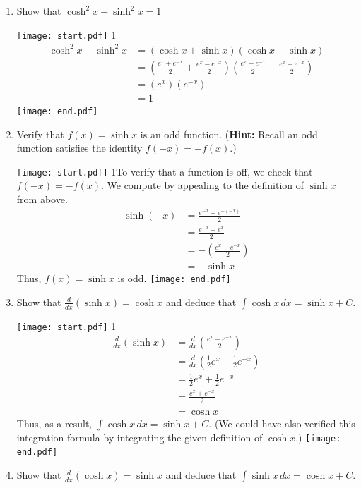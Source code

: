 \documentclass[12pt]{article}
\begin{document}
\begin{enumerate}
\begin{enumerate}

\item Show that $\cosh^2{x}-\sinh^2{x}=1$

\texttt{[image: start.pdf]}
{{{1\linewidth}{
\begin{align*}
\cosh^2{x}-\sinh^{2}{x} & = (\cosh{x}+\sinh{x})(\cosh{x}-\sinh{x})\\
&=\left(\frac{e^x+e^{-x}}{2}+\frac{e^x-e^{-x}}{2}\right)\left(\frac{e^x+e^{-x}}{2}-\frac{e^x-e^{-x}}{2}\right)\\
&=(e^x)(e^{-x})\\
&=1
\end{align*}
}}}
\texttt{[image: end.pdf]}


\item Verify that $f(x)=\sinh{x}$ is an odd function. ({\bf Hint:} Recall an odd function satisfies the identity $f(-x)=-f(x)$.)

\texttt{[image: start.pdf]}
{{{1\linewidth}{To verify that a function is off, we check that $f(-x)=-f(x)$. We compute by appealing to the definition of $\sinh{x}$ from above.
\begin{align*}
\sinh{(-x)}&=\frac{e^{-x}-e^{-(-x)}}{2}\\
&=\frac{e^{-x}-e^{x}}{2}\\
&=-\left(\frac{e^{x}-e^{-x}}{2}\right)\\
&=-\sinh{x}
\end{align*}
Thus, $f(x)=\sinh{x}$ is odd.}}}
\texttt{[image: end.pdf]}


\item Show that $\frac{d}{dx}(\sinh{x})=\cosh{x}$ and deduce that $\int \cosh{x}\,dx=\sinh{x}+C$.

\texttt{[image: start.pdf]}
{{{1\linewidth}{
\begin{align*}
\frac{d}{dx}(\sinh{x}) &= \frac{d}{dx}\left(\frac{e^x-e^{-x}}{2}\right)\\
&=\frac{d}{dx}\left(\frac{1}{2}e^x-\frac{1}{2}e^{-x}\right)\\
&=\frac{1}{2}e^x+\frac{1}{2}e^{-x}\\
&=\frac{e^x+e^{-x}}{2}\\
&=\cosh{x}
\end{align*}
Thus, as a result, $\int \cosh{x}\,dx=\sinh{x}+C$.  (We could have also verified this integration formula by integrating the given definition of $\cosh{x}$.)
}}}
\texttt{[image: end.pdf]}


\item Show that $\frac{d}{dx}(\cosh{x})=\sinh{x}$ and deduce that $\int \sinh{x}\,dx=\cosh{x}+C$.


\end{enumerate}
\end{enumerate}
\end{document}
